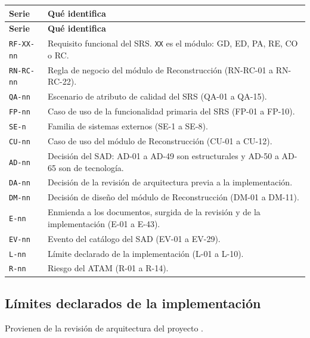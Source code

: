 \documentclass[11pt,a4paper]{article}
\begin{document}
{\small
\begin{longtable}{|P{2.4cm}|P{11.8cm}|}
  \hline
  \textbf{Serie} & \textbf{Qué identifica} \\ \hline
  \endfirsthead
  \hline
  \textbf{Serie} & \textbf{Qué identifica} \\ \hline
  \endhead
  \texttt{RF-XX-nn} & Requisito funcional del SRS. \texttt{XX} es el módulo: GD, ED, PA, RE, CO o RC. \\ \hline
  \texttt{RN-RC-nn} & Regla de negocio del módulo de Reconstrucción (RN-RC-01 a RN-RC-22). \\ \hline
  \texttt{QA-nn} & Escenario de atributo de calidad del SRS (QA-01 a QA-15). \\ \hline
  \texttt{FP-nn} & Caso de uso de la funcionalidad primaria del SRS (FP-01 a FP-10). \\ \hline
  \texttt{SE-n} & Familia de sistemas externos (SE-1 a SE-8). \\ \hline
  \texttt{CU-nn} & Caso de uso del módulo de Reconstrucción (CU-01 a CU-12). \\ \hline
  \texttt{AD-nn} & Decisión del SAD: AD-01 a AD-49 son estructurales y AD-50 a AD-65 son de tecnología. \\ \hline
  \texttt{DA-nn} & Decisión de la revisión de arquitectura previa a la implementación. \\ \hline
  \texttt{DM-nn} & Decisión de diseño del módulo de Reconstrucción (DM-01 a DM-11). \\ \hline
  \texttt{E-nn} & Enmienda a los documentos, surgida de la revisión y de la implementación (E-01 a E-43). \\ \hline
  \texttt{EV-nn} & Evento del catálogo del SAD (EV-01 a EV-29). \\ \hline
  \texttt{L-nn} & Límite declarado de la implementación (L-01 a L-10). \\ \hline
  \texttt{R-nn} & Riesgo del ATAM (R-01 a R-14). \\ \hline
\end{longtable}
}

\subsection*{Límites declarados de la implementación}

Provienen de la revisión de arquitectura del proyecto \cite{revision}.
\end{document}
